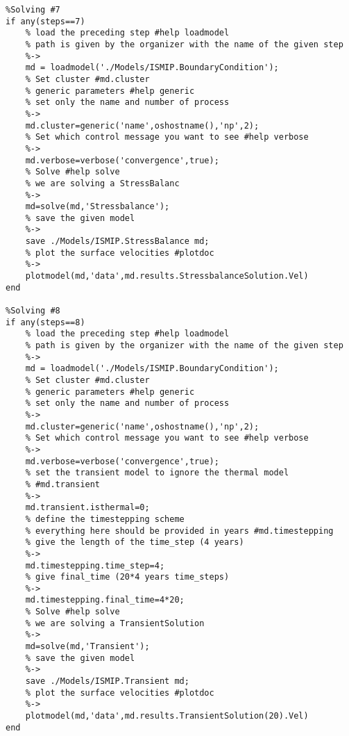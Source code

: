 \begin{verbatim}
%Solving #7
if any(steps==7)
	% load the preceding step #help loadmodel
	% path is given by the organizer with the name of the given step
	%->
	md = loadmodel('./Models/ISMIP.BoundaryCondition');
	% Set cluster #md.cluster
	% generic parameters #help generic
	% set only the name and number of process
	%->
	md.cluster=generic('name',oshostname(),'np',2);
	% Set which control message you want to see #help verbose
	%->
	md.verbose=verbose('convergence',true);
	% Solve #help solve
	% we are solving a StressBalanc
	%->
	md=solve(md,'Stressbalance');
	% save the given model
	%->
	save ./Models/ISMIP.StressBalance md;
	% plot the surface velocities #plotdoc
	%->
	plotmodel(md,'data',md.results.StressbalanceSolution.Vel)
end

%Solving #8
if any(steps==8)
	% load the preceding step #help loadmodel
	% path is given by the organizer with the name of the given step
	%->
	md = loadmodel('./Models/ISMIP.BoundaryCondition');
	% Set cluster #md.cluster
	% generic parameters #help generic
	% set only the name and number of process
	%->
	md.cluster=generic('name',oshostname(),'np',2);
	% Set which control message you want to see #help verbose
	%->
	md.verbose=verbose('convergence',true);
	% set the transient model to ignore the thermal model
	% #md.transient
	%->
	md.transient.isthermal=0;
	% define the timestepping scheme
	% everything here should be provided in years #md.timestepping
	% give the length of the time_step (4 years)
	%->
	md.timestepping.time_step=4;
	% give final_time (20*4 years time_steps)
	%->
	md.timestepping.final_time=4*20;
	% Solve #help solve
	% we are solving a TransientSolution
	%->
	md=solve(md,'Transient');
	% save the given model
	%->
	save ./Models/ISMIP.Transient md;
	% plot the surface velocities #plotdoc
	%->
	plotmodel(md,'data',md.results.TransientSolution(20).Vel)
end\end{verbatim}
